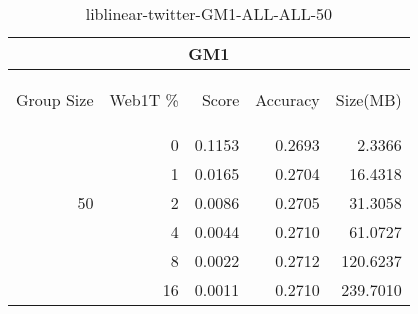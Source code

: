 \begin{center}
\begin{table}[htbp] 
 \begin{center}
\begin{tabular}{ | r | r | r | r | r |}
\hline
\multicolumn{5}{|c|}{GM1}\\
\hline
\begin{sideways}Group Size\end{sideways} & \begin{sideways}Web1T \%\end{sideways} & \begin{sideways}Score\end{sideways} & \begin{sideways}Accuracy\end{sideways} & \begin{sideways}Size(MB)\end{sideways}\\
\hline
\multirow{5}{*}{50}
 & 0 & 0.1153 & 0.2693 & 2.3366\\ \cline{2-5}
 & 1 & 0.0165 & 0.2704 & 16.4318\\ \cline{2-5}
 & 2 & 0.0086 & 0.2705 & 31.3058\\ \cline{2-5}
 & 4 & 0.0044 & 0.2710 & 61.0727\\ \cline{2-5}
 & 8 & 0.0022 & 0.2712 & 120.6237\\ \cline{2-5}
 & 16 & 0.0011 & 0.2710 & 239.7010\\ \cline{2-5}
\hline
\end{tabular}
\caption{liblinear-twitter-GM1-ALL-ALL-50}
\label{table:liblinear-twitter-GM1-ALL-ALL-50}
\end{center}
 \end{table}
\end{center}

